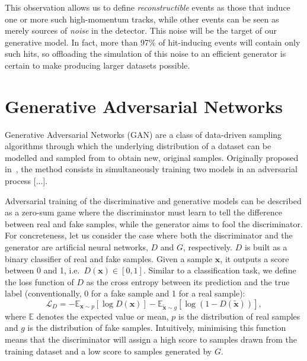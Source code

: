 This observation allows us to define \emph{reconstructible} events as those that induce one or more such high-momentum tracks, while other events can be seen as merely sources of \emph{noise} in the detector. This noise will be the target of our generative model. In fact, more than 97\% of hit-inducing events will contain only such hits, so offloading the simulation of this noise to an efficient generator is certain to make producing larger datasets possible.




\section{Generative Adversarial Networks} %
Generative Adversarial Networks (GAN) are a class of data-driven sampling algorithms through which the underlying distribution of a dataset can be modelled and sampled from to obtain new, original samples. %
Originally proposed in~\cite{goodfellow_generative_2014}, the method consists in simultaneously training two models in an adversarial process [...].

Adversarial training of the discriminative and generative models can be described as a zero-sum game where the discriminator must learn to tell the difference between real and fake samples, while the generator aims to fool the discriminator.
For concreteness, let us consider the case where both the discriminator and the generator are artificial neural networks, $D$ and $G$, respectively. $D$ is built as a binary classifier of real and fake samples. Given a sample $\mathbf{x}$, it outputs a score between 0 and 1, i.e.\ $D(\mathbf{x}) \in [0, 1]$. Similar to a classification task, we define the loss function of $D$ as the cross entropy between its prediction and the true label (conventionally, 0 for a fake sample and 1 for a real sample):
\begin{equation}\label{eq:D_loss}
    \mathcal{L}_D = 
    -\mathbb{E}_{\mathbf{x} \sim p} [ \log D(\mathbf{x}) ] -
    \mathbb{E}_{\tilde{\mathbf{x}} \sim g} [ \log( 1 - D(\tilde{\mathbf{x}}) )],
\end{equation}
where $\mathbb{E}$ denotes the expected value or mean, $p$ is the distribution of real samples and $g$ is the distribution of fake samples.
Intuitively, minimising this function means that the discriminator will assign a high score to samples drawn from the training dataset and a low score to samples generated by $G$.

